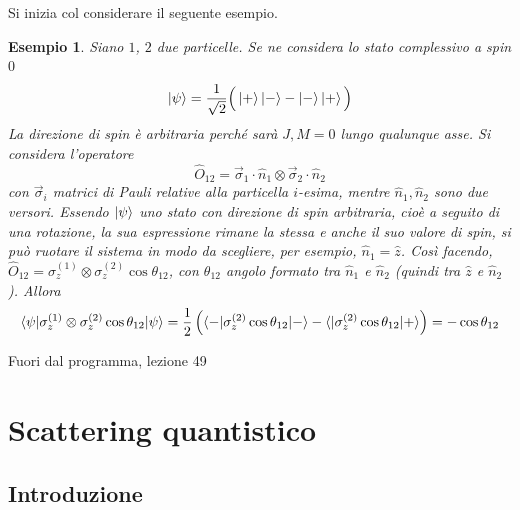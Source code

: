 \documentclass[11pt, a4paper]{scrartcl} %
\numberwithin{equation}{subsection}
\theoremstyle{style2}
\theoremstyle{style1}
\newtheorem{esempio}{Esempio}[section]
\begin{document}
Si inizia col considerare il seguente esempio.
\begin{esempio}
Siano $1$, $2$ due particelle. 
Se ne considera lo stato complessivo a spin $0$ 
\[
\ket{\psi } = \frac{1}{\sqrt{2} } \Big(\ket{+} \ket{-} - \ket{-} \ket{+} \Big)
\] 
La direzione di spin \`e arbitraria perch\'e sar\`a $J,M=0$ lungo qualunque asse. 
Si considera l'operatore 
\[
\hat{O}_{12} = \vec{\sigma }_1 \cdot \hat{n}_1 \otimes \vec{\sigma }_2 \cdot \hat{n}_2
\] 
con $\vec{\sigma }_i$ matrici di Pauli relative alla particella $i$-esima, mentre $\hat{n}_1, \hat{n}_2$ sono due versori.
Essendo $\ket{\psi } $ uno stato con direzione di spin arbitraria, cio\`e a seguito di una rotazione, la sua espressione rimane la stessa e anche il suo valore di spin, si pu\`o ruotare il sistema in modo da scegliere, per esempio, $\hat{n}_1 = \hat{z}$.
Cos\`i facendo, $\hat{O}_{12} = \sigma ^{(1)} _z \otimes \sigma ^{(2)} _z \cos \theta _{12} $, con $\theta _{12} $ angolo formato tra $\hat{n}_1$ e $\hat{n}_2$ (quindi tra $\hat{z}$ e $\hat{n}_2$).
Allora
\[
\braket{\psi |\sigma ^{(1)} _z \otimes \sigma ^{(2)} _z \cos \theta _{12} |\psi } = \frac{1}{2} \left(\braket{-|\sigma ^{(2)} _z \cos\theta _{12} |-} - \braket{|\sigma ^{(2)} _z \cos \theta _{12} |+} \right) = - \cos \theta _{12} 
\] 
\end{esempio}
\begin{center}
	Fuori dal programma, lezione 49	
\end{center}

\newpage

\section{Scattering quantistico}
\subsection{Introduzione}
\end{document}

